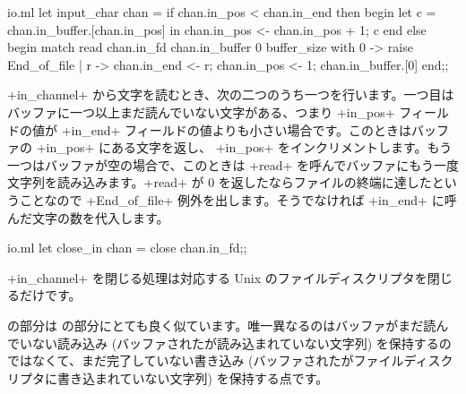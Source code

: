 %
\begin{listingcodefile}{io.ml}
let input_char chan =
  if chan.in_pos < chan.in_end then begin
    let c =  chan.in_buffer.[chan.in_pos] in
      chan.in_pos <- chan.in_pos + 1;
      c
  end else begin
    match read chan.in_fd chan.in_buffer 0 buffer_size
    with 0 -> raise End_of_file
       | r -> chan.in_end <- r;
              chan.in_pos <- 1;
              chan.in_buffer.[0]
  end;;
\end{listingcodefile}
%
\ml+in_channel+ から文字を読むとき、次の二つのうち一つを行います。一つ目はバッファに一つ以上まだ読んでいない文字がある、つまり \ml+in_pos+ フィールドの値が \ml+in_end+ フィールドの値よりも小さい場合です。このときはバッファの \ml+in_pos+ にある文字を返し、 \ml+in_pos+ をインクリメントします。もう一つはバッファが空の場合で、このときは \ml+read+ を呼んでバッファにもう一度文字列を読み込みます。\ml+read+ が 0 を返したならファイルの終端に達したということなので \ml+End_of_file+ 例外を出します。そうでなければ \ml+in_end+ に呼んだ文字の数を代入します。
%
\begin{listingcodefile}{io.ml}
let close_in chan =
  close chan.in_fd;;
\end{listingcodefile}
%
\ml+in_channel+ を閉じる処理は対応する Unix のファイルディスクリプタを閉じるだけです。

 の部分は  の部分にとても良く似ています。唯一異なるのはバッファがまだ読んでいない読み込み (バッファされたが読み込まれていない文字列) を保持するのではなくて、まだ完了していない書き込み (バッファされたがファイルディスクリプタに書き込まれていない文字列) を保持する点です。

